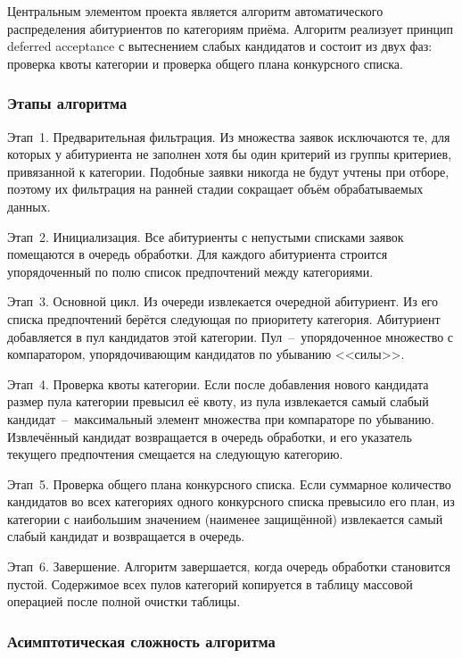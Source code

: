 Центральным элементом проекта является алгоритм автоматического распределения абитуриентов по категориям приёма.
Алгоритм реализует принцип deferred acceptance  с вытеснением слабых кандидатов  и состоит из двух фаз: проверка квоты категории и проверка общего плана конкурсного списка.

\subsubsection{Этапы алгоритма}

Этап~1. Предварительная фильтрация.
Из множества заявок исключаются те, для которых у абитуриента не заполнен хотя бы один критерий из группы критериев, привязанной к категории.
Подобные заявки никогда не будут учтены при отборе, поэтому их фильтрация на ранней стадии сокращает объём обрабатываемых данных.

Этап~2. Инициализация.
Все абитуриенты с непустыми списками заявок помещаются в очередь обработки.
Для каждого абитуриента строится упорядоченный по полю  список предпочтений между категориями.

Этап~3. Основной цикл.
Из очереди извлекается очередной абитуриент.
Из его списка предпочтений берётся следующая по приоритету категория.
Абитуриент добавляется в пул кандидатов этой категории.
Пул~--~упорядоченное множество с компаратором, упорядочивающим кандидатов по убыванию <<силы>>.

Этап~4. Проверка квоты категории.
Если после добавления нового кандидата размер пула категории превысил её квоту, из пула извлекается самый слабый кандидат~--~максимальный элемент множества при компараторе по убыванию.
Извлечённый кандидат возвращается в очередь обработки, и его указатель текущего предпочтения смещается на следующую категорию.

Этап~5. Проверка общего плана конкурсного списка.
Если суммарное количество кандидатов во всех категориях одного конкурсного списка превысило его план, из категории с наибольшим значением  (наименее защищённой) извлекается самый слабый кандидат и возвращается в очередь.

Этап~6. Завершение.
Алгоритм завершается, когда очередь обработки становится пустой.
Содержимое всех пулов категорий копируется в таблицу  массовой операцией после полной очистки таблицы.

\subsubsection{Асимптотическая сложность алгоритма}


